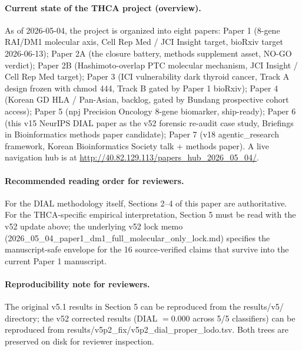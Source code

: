 \documentclass[11pt,a4paper]{article}
\begin{document}
\paragraph{Current state of the THCA project (overview).} As of
2026-05-04, the project is organized into eight papers:
Paper 1 (8-gene RAI/DM1 molecular axis, Cell Rep Med / JCI Insight
target, bioRxiv target 2026-06-13);
Paper 2A (the closure battery, methods supplement asset, NO-GO
verdict);
Paper 2B (Hashimoto-overlap PTC molecular mechanism, JCI Insight
/ Cell Rep Med target);
Paper 3 (ICI vulnerability dark thyroid cancer, Track A design
frozen with chmod 444, Track B gated by Paper 1 bioRxiv);
Paper 4 (Korean GD HLA / Pan-Asian, backlog, gated by Bundang
prospective cohort access);
Paper 5 (npj Precision Oncology 8-gene biomarker, ship-ready);
Paper 6 (this v15 NeurIPS DIAL paper as the v52 forensic re-audit
case study, Briefings in Bioinformatics methods paper candidate);
Paper 7 (v18 agentic\_research framework, Korean Bioinformatics
Society talk + methods paper). A live navigation hub is at
\url{http://40.82.129.113/papers_hub_2026_05_04/}.

\paragraph{Recommended reading order for reviewers.} For the DIAL
methodology itself, Sections 2--4 of this paper are authoritative.
For the THCA-specific empirical interpretation, Section 5 must be
read with the v52 update above; the underlying v52 lock memo
(2026\_05\_04\_paper1\_dm1\_full\_molecular\_only\_lock.md)
specifies the manuscript-safe envelope for the 16 source-verified
claims that survive into the current Paper 1 manuscript.

\paragraph{Reproducibility note for reviewers.} The original v5.1
results in Section 5 can be reproduced from the
results/v5/ directory; the v52 corrected results (DIAL
$= 0.000$ across 5/5 classifiers) can be reproduced from
results/v5p2\_fix/v5p2\_dial\_proper\_lodo.tsv. Both
trees are preserved on disk for reviewer inspection.



\end{document}

